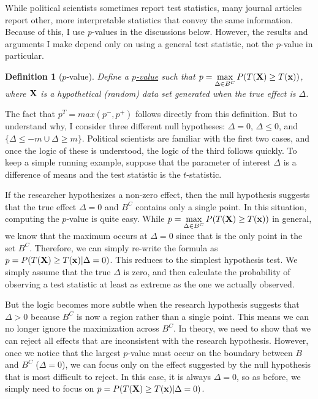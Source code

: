 \documentclass[12pt]{article}
\newtheorem{mydef}{Definition}
\begin{document}
While political scientists sometimes report test statistics, many journal articles report other, more interpretable statistics that convey the same information.  Because of this, I use \textit{p}-values in the discussions below. However, the results and arguments I make depend only on using a general test statistic, not the $p$-value in particular.

\begin{mydef}[$p$-value]
Define a \underline{$p$-value} such that $p =\displaystyle \max_{\Delta \in B^C} P(T({\bf X}) \geq T({\bf x}))$, where ${\bf X}$ is a hypothetical (random) data set generated when the true effect is $\Delta$.
\end{mydef}

The fact that $p^T = max(p^-, p^+)$ follows directly from this definition. But to understand why, I consider three different null hypotheses: $\Delta = 0$, $\Delta \leq 0$, and $\{\Delta \leq -m \cup \Delta \geq m\}$. Political scientists are familiar with the first two cases, and once the logic of these is understood, the logic of the third follows quickly. To keep a simple running example, suppose that the parameter of interest $\Delta$ is a difference of means and the test statistic is the $t$-statistic.

If the researcher hypothesizes a non-zero effect, then the null hypothesis suggests that the true effect $\Delta=0$  and $B^C$ contains only a single point. In this situation, computing the $p$-value is quite easy. While  $p =\displaystyle \max_{\Delta \in B^C} P(T({\bf X}) \geq T({\bf x}))$ in general, we know that the maximum occurs at $\Delta = 0$ since that is the only point in the set $B^C$. Therefore, we can simply re-write the formula as $p =\displaystyle P(T({\bf X}) \geq T({\bf x}) | \Delta = 0)$. This reduces to the simplest hypothesis test. We simply assume that the true $\Delta$ is zero, and then calculate the probability of observing a test statistic at least as extreme as the one we actually observed. 

But the logic becomes more subtle when the research hypothesis suggests that $\Delta > 0$ because $B^C$ is now a region rather than a single point. This means we can no longer ignore the maximization across $B^C$. In theory, we need to show that we can reject all effects that are inconsistent with the research hypothesis. However, once we notice that the largest $p$-value must occur on the boundary between $B$ and $B^C$ ($\Delta = 0$), we can focus only on the effect suggested by the null hypothesis that is most difficult to reject. In this case, it is always $\Delta = 0$, so as before, we simply need to focus on $p =\displaystyle P(T({\bf X}) \geq T({\bf x}) | \Delta = 0)$.
\end{document}
